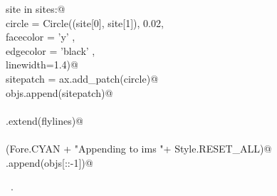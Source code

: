 \documentclass[11.5pt]{report}
\begin{document}
\begin{flushleft}
\begin{minipage}{\linewidth}
\begin{list}{}{}
\mbox{}\verb@for site in sites:@\\
\mbox{}\verb@    circle = Circle((site[0], site[1]), 0.02, \@\\
\mbox{}\verb@                    facecolor = 'y'   , \@\\
\mbox{}\verb@                    edgecolor = 'black'     , \@\\
\mbox{}\verb@                    linewidth=1.4)@\\
\mbox{}\verb@    sitepatch = ax.add_patch(circle)@\\
\mbox{}\verb@    objs.append(sitepatch)@\\
\mbox{}\verb@@\\
\mbox{}\verb@objs.extend(flylines)@\\
\mbox{}\verb@@\\
\mbox{}\verb@debug(Fore.CYAN + "Appending to ims "+ Style.RESET_ALL)@\\
\mbox{}\verb@ims.append(objs[::-1])@\\
\mbox{}\verb@@{\NWsep}
\end{list}
\vspace{-1.5ex}
\footnotesize
\begin{list}{}{\setlength{\itemsep}{-\parsep}\setlength{\itemindent}{-\leftmargin}}
\item \NWtxtMacroRefIn\ .

\item{}
\end{list}
\end{minipage}\vspace{4ex}
\end{flushleft}
\end{document}

